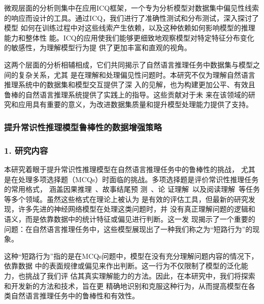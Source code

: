 微观层面的分析则集中在应用ICQ框架，一个专为分析模型对数据集中偏见性线索
的响应而设计的工具。通过ICQ，我们进行了准确性测试和分布测试，深入探讨了模型
如何在训练过程中对这些线索产生依赖，以及这种依赖如何影响模型的推理能力和整体性
能。ICQ的应用使我们能够更细致地观察模型对特定特征分布变化的敏感性，为理解模型行为提
供了更加丰富和直观的视角。

这两个层面的分析相辅相成，它们共同揭示了自然语言推理任务中数据集与模型之间的复杂关系，尤其
是在理解和处理偏见性问题时。本研究不仅为理解自然语言推理系统中的数据集和模型交互提供了深
入的见解，也为构建更加公平、有效且鲁棒的自然语言推理系统提供了实践上的指导。这些贡献对于未
来在该领域的研究和应用具有重要的意义，为改进数据集质量和提升模型处理能力提供了支持。

\subsubsection{提升常识性推理模型鲁棒性的数据增强策略}

\subsubsection*{1. 研究内容}
本研究着眼于提升常识性推理模型在自然语言推理任务中的鲁棒性的挑战，
尤其是在处理多项选择题（MCQs）时面临的挑战。多项选择题是评价常识性推理任务的常用格式，
涵盖因果推理~\cite{roemmele2011choice}、故事结尾预
测~\cite{mostafazadeh2016corpus,huang20story}、论
证理解~\cite{habernal2018argument}以及阅读理解~\cite{yu2020reclor}等任务
等多个领域。虽然这些格式在理论上被认为
是有效的评估工具，但最新的研究发现，许多先进的神经网络模型在处理这类问题时，并
没有真正理解问题的逻辑和语义，而是依靠数据中的统计特征或偏见进行判断。这一发
现揭示了一个重要的问题：在自然语言推理任务中，这些模型展现出了一种我们称之为``短路行为''的现象。

这种``短路行为''指的是在MCQs问题中，模型在没有充分理解问题内容的情况下，依靠数据
中的表面规律或偏见来作出判断。这一行为不仅限制了模型的泛化能力，也挑战了我们评
估其真实理解能力的方法。因此，在本研究中，我们将探索和开发新的方法和技术，旨在更
精确地识别和克服这种行为，从而提高模型在各类自然语言推理任务中的鲁棒性和有效性。

